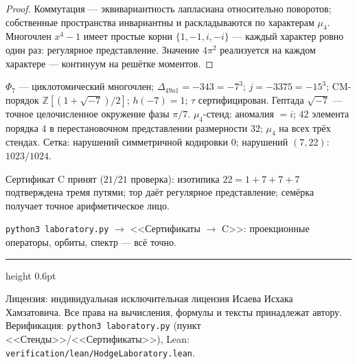 \documentclass[11pt,a4paper]{article}
\theoremstyle{plain}
\theoremstyle{definition}
\theoremstyle{remark}
\newcommand{\ZZ}{\mathbb{Z}}
\begin{document}
\begin{proof}
Коммутация --- эквивариантность лапласиана относительно поворотов;
собственные пространства инвариантны и раскладываются по характерам
$\mu_4$. Многочлен $x^4-1$ имеет простые корни $\{1,-1,i,-i\}$ ---
каждый характер ровно один раз: регулярное представление. Значение
$4\pi^2$ реализуется на каждом характере --- континуум на решётке
моментов.
\end{proof}

\begin{databox}
$\Phi_7$ --- циклотомический многочлен; $\Delta_{49a1}=-343=-7^3$;
$j=-3375=-15^3$; CM-порядок $\ZZ[(1+\sqrt{-7})/2]$; $h(-7)=1$;
$\tau$ сертифицирован. Гептада $\sqrt{-7}$ --- точное целочисленное
окружение фазы $\pi/7$.
$\mu_4$-стенд: аномалия $=i$; $42$ элемента порядка $4$ в
перестановочном представлении размерности $32$; $\mu_4$ на всех
трёх стендах. Сетка: нарушений симметричной кодировки $0$;
нарушений $(7,22)$: $1023/1024$.
\end{databox}

\begin{statusbox}[итог]
Сертификат C принят ($21/21$ проверка): изотипика $22=1+7+7+7$
подтверждена тремя путями; тор даёт регулярное представление;
семёрка получает точное арифметическое лицо.
\end{statusbox}

\begin{verifybox}
\texttt{python3 laboratory.py} $\to$ <<Сертификаты $\to$ C>>:
проекционные операторы, орбиты, спектр --- всё точно.
\end{verifybox}

\vfill
{\color{linkblue}\hrule height 0.6pt}
\vspace{0.5em}
{\small\color{gray}
Лицензия: индивидуальная исключительная лицензия Исаева Исхака Хамзатовича.
Все права на вычисления, формулы и тексты принадлежат автору.
Верификация: \texttt{python3 laboratory.py} (пункт <<Стенды>>/<<Сертификаты>>),
Lean: \texttt{verification/lean/HodgeLaboratory.lean}.
}
\end{document}
